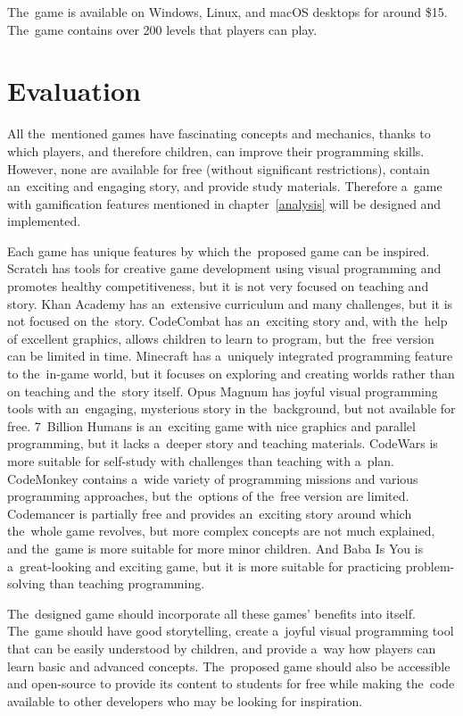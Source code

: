 The~game is available on Windows, Linux, and macOS desktops for around \$15.
The~game contains over 200 levels that players can play.

\section{Evaluation}

All the~mentioned games have fascinating concepts and mechanics, thanks to which players, and therefore children, can improve their programming skills.
However, none are available for free (without significant restrictions), contain an~exciting and engaging story, and provide study materials.
Therefore a~game with gamification features mentioned in chapter~\ref{analysis} will be designed and implemented.

Each game has unique features by which the~proposed game can be inspired.
Scratch has tools for creative game development using visual programming and promotes healthy competitiveness, but it is not very focused on teaching and story.
Khan Academy has an~extensive curriculum and many challenges, but it is not focused on the~story.
CodeCombat has an~exciting story and, with the~help of excellent graphics, allows children to learn to program, but the~free version can be limited in time.
Minecraft has a~uniquely integrated programming feature to the~in-game world, but it focuses on exploring and creating worlds rather than on teaching and the~story itself.
Opus Magnum has joyful visual programming tools with an~engaging, mysterious story in the~background, but not available for free.
7~Billion Humans is an~exciting game with nice graphics and parallel programming, but it lacks a~deeper story and teaching materials.
CodeWars is more suitable for self-study with challenges than teaching with a~plan.
CodeMonkey contains a~wide variety of programming missions and various programming approaches, but the~options of the~free version are limited.
Codemancer is partially free and provides an~exciting story around which the~whole game revolves, but more complex concepts are not much explained, and the~game is more suitable for more minor children.
And Baba Is You is a~great-looking and exciting game, but it is more suitable for practicing problem-solving than teaching programming.

The~designed game should incorporate all these games' benefits into itself.
The~game should have good storytelling, create a~joyful visual programming tool that can be easily understood by children, and provide a~way how players can learn basic and advanced concepts. 
The~proposed game should also be accessible and open-source to provide its content to students for free while making the~code available to other developers who may be looking for inspiration.

